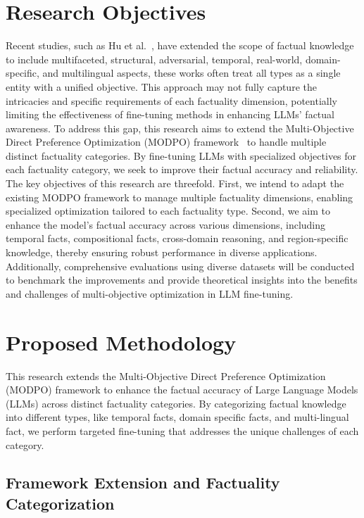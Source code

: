 \documentclass{article}
\begin{document}
\section{Research Objectives}
Recent studies, such as Hu et al.~\cite{UNDERSTANDINGFACTUALKNOWLEDGELARGELANGUAGE2024a}, have extended the scope of factual knowledge to include multifaceted, structural, adversarial, temporal, real-world, domain-specific, and multilingual aspects, these works often treat all types as a single entity with a unified objective. This approach may not fully capture the intricacies and specific requirements of each factuality dimension, potentially limiting the effectiveness of fine-tuning methods in enhancing LLMs' factual awareness.
To address this gap, this research aims to extend the Multi-Objective Direct Preference Optimization (MODPO) framework~\cite{OnePreferenceFitsAllAlignmentMultiObjectiveDirectPreference2024} to handle multiple distinct factuality categories. By fine-tuning LLMs with specialized objectives for each factuality category, we seek to improve their factual accuracy and reliability. The key objectives of this research are threefold. First, we intend to adapt the existing MODPO framework to manage multiple factuality dimensions, enabling specialized optimization tailored to each factuality type. Second, we aim to enhance the model's factual accuracy across various dimensions, including temporal facts, compositional facts, cross-domain reasoning, and region-specific knowledge, thereby ensuring robust performance in diverse applications. Additionally, comprehensive evaluations using diverse datasets will be conducted to benchmark the improvements and provide theoretical insights into the benefits and challenges of multi-objective optimization in LLM fine-tuning.

\section{Proposed Methodology}

This research extends the Multi-Objective Direct Preference Optimization (MODPO) framework to enhance the factual accuracy of Large Language Models (LLMs) across distinct factuality categories. By categorizing factual knowledge into different types, like temporal facts, domain specific facts, and multi-lingual fact, we perform targeted fine-tuning that addresses the unique challenges of each category.

\subsection{Framework Extension and Factuality Categorization}
\end{document}
